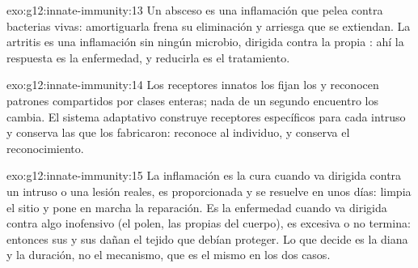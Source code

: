 \begin{solution}{exo:g12:innate-immunity:13}
Un absceso es una inflamación que pelea contra bacterias vivas:
amortiguarla frena su eliminación y arriesga que se extiendan. La
artritis es una inflamación sin ningún microbio, dirigida contra la
propia : ahí la respuesta es la enfermedad, y reducirla es
el tratamiento.
\end{solution}

\begin{solution}{exo:g12:innate-immunity:14}
Los receptores innatos los fijan los  y reconocen patrones
compartidos por clases enteras; nada de un segundo encuentro los
cambia. El sistema adaptativo construye receptores específicos para
cada intruso y conserva las  que los fabricaron: reconoce al
individuo, y conserva el reconocimiento.
\end{solution}

\begin{solution}{exo:g12:innate-immunity:15}
La inflamación es la cura cuando va dirigida contra un intruso o una
lesión reales, es proporcionada y se resuelve en unos días: limpia el
sitio y pone en marcha la reparación. Es la enfermedad cuando va
dirigida contra algo inofensivo (el polen, las propias 
del cuerpo), es excesiva o no termina: entonces sus  y sus
 dañan el tejido que debían proteger. Lo que decide es la
diana y la duración, no el mecanismo, que es el mismo en los dos casos.
\end{solution}

